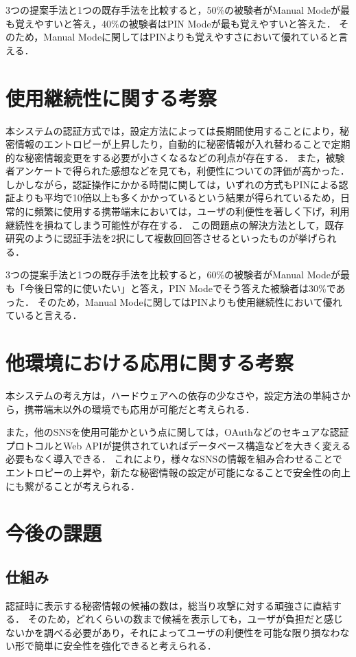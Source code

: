 3つの提案手法と1つの既存手法を比較すると，50\%の被験者がManual Modeが最も覚えやすいと答え，40\%の被験者はPIN Modeが最も覚えやすいと答えた．
そのため，Manual Modeに関してはPINよりも覚えやすさにおいて優れていると言える．

\section{使用継続性に関する考察}\label{sec:continuity}
本システムの認証方式では，設定方法によっては長期間使用することにより，秘密情報のエントロピーが上昇したり，自動的に秘密情報が入れ替わることで定期的な秘密情報変更をする必要が小さくなるなどの利点が存在する．
また，被験者アンケートで得られた感想などを見ても，利便性についての評価が高かった．
しかしながら，認証操作にかかる時間に関しては，いずれの方式もPINによる認証よりも平均で10倍以上も多くかかっているという結果が得られているため，日常的に頻繁に使用する携帯端末においては，ユーザの利便性を著しく下げ，利用継続性を損ねてしまう可能性が存在する．
この問題点の解決方法として，既存研究のように認証手法を2択にして複数回回答させるといったものが挙げられる．

3つの提案手法と1つの既存手法を比較すると，60\%の被験者がManual Modeが最も「今後日常的に使いたい」と答え，PIN Modeでそう答えた被験者は30\%であった．
そのため，Manual Modeに関してはPINよりも使用継続性において優れていると言える．

\section{他環境における応用に関する考察}\label{sec:application}
本システムの考え方は，ハードウェアへの依存の少なさや，設定方法の単純さから，携帯端末以外の環境でも応用が可能だと考えられる．

また，他のSNSを使用可能かという点に関しては，OAuthなどのセキュアな認証プロトコルとWeb APIが提供されていればデータベース構造などを大きく変える必要もなく導入できる．
これにより，様々なSNSの情報を組み合わせることでエントロピーの上昇や，新たな秘密情報の設定が可能になることで安全性の向上にも繋がることが考えられる．

\section{今後の課題}
\subsection{仕組み}
認証時に表示する秘密情報の候補の数は，総当り攻撃に対する頑強さに直結する．
そのため，どれくらいの数まで候補を表示しても，ユーザが負担だと感じないかを調べる必要があり，それによってユーザの利便性を可能な限り損なわない形で簡単に安全性を強化できると考えられる．


